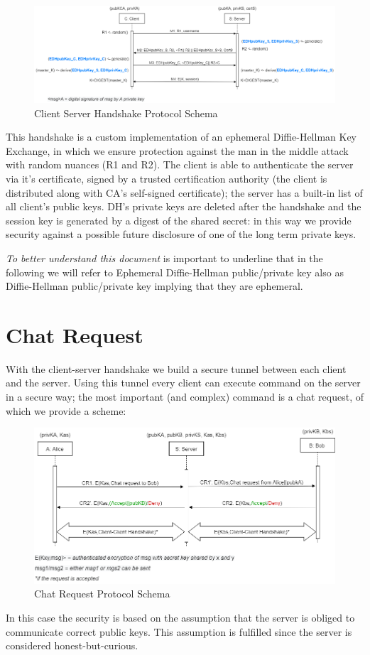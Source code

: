 \documentclass[11pt]{report}
\begin{document}
\begin{figure}[H]
	\centering
	\includegraphics[scale=0.4]{img/AuthClientServerVer2.png}
	\caption{Client Server Handshake Protocol Schema}
	\label {img: AuthClientServer}
\end{figure}

\noindent This handshake is a custom implementation of an ephemeral Diffie-Hellman Key Exchange, in which we ensure
protection against the man in the middle attack with random nuances (R1 and R2). The client is able to 
authenticate the server via it's certificate, signed by a trusted certification authority (the client
is distributed along with CA's self-signed certificate); the server has a built-in list of all client's
public keys. DH's private keys are deleted after the handshake and the session key is generated by a digest of the 
shared secret: in this way we provide security against a possible future disclosure of one of the long term private keys. 

\noindent \emph{To better understand this document} is important to underline that in the following we will refer to Ephemeral Diffie-Hellman public/private key also as Diffie-Hellman public/private key implying that they are ephemeral. 

\newpage
\section{Chat Request}
With the client-server handshake we build a secure tunnel between each client and the server. Using this 
tunnel every client can execute command on the server in a secure way; the most important (and complex) command
is a chat request, of which we provide a scheme:
\begin{figure}[H]
	\centering
	\includegraphics[scale=0.5]{img/ChatRequestVer2.png}
	\caption{Chat Request Protocol Schema}
	\label {img: ChatRequest}
\end{figure}
\noindent In this case the security is based on the assumption that the server is obliged to communicate correct public keys. This assumption is fulfilled since the server is considered honest-but-curious.
\end{document}
